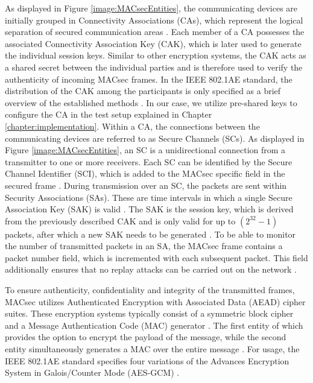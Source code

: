 \documentclass[conference, onecolumn, a4paper]{IEEEtran}
\begin{document}
\noindent As displayed in Figure \ref{image:MACsecEntities}, the communicating devices are initially grouped in Connectivity Associations (CAs), which 
represent the logical separation of secured communication areas \cite[p. 35]{IEEE-802-1AE:2018}. Each member of a CA possesses the associated Connectivity 
Association Key (CAK), which is later used to generate the individual session keys. Similar to other encryption systems, the CAK acts as a shared 
secret between the individual parties and is therefore used to verify the authenticity of incoming MACsec frames. In the IEEE 802.1AE standard, the 
distribution of the CAK among the participants is only specified as a brief overview of the established methods \cite[p. 230]{IEEE-802-1AE:2018}. 
In our case, we utilize pre-shared keys to configure the CA in the test setup explained in Chapter \ref{chapter:implementation}. Within a CA, the 
connections between the communicating devices are referred to as Secure Channels (SCs). As displayed in Figure \ref{image:MACsecEntities}, 
an SC is a unidirectional connection from a transmitter to one or more receivers. Each SC can be identified by the Secure Channel Identifier (SCI), 
which is added to the MACsec specific field in the secured frame \cite[p. 43]{IEEE-802-1AE:2018}. During transmission over an SC, the packets are sent 
within Security Associations (SAs). These are time intervals in which a single Secure Association Key (SAK) is valid \cite[p. 44]{IEEE-802-1AE:2018}. 
The SAK is the session key, which is derived from the previously described CAK and is only valid for up to ${(2^{32} -1)}$ packets, after which a new 
SAK needs to be generated \cite[p. 66]{IEEE-802-1AE:2018}. To be able to monitor the number of transmitted packets in an SA, the MACsec frame contains 
a packet number field, which is incremented with each subsequent packet. This field additionally ensures that no replay attacks can be carried out on 
the network \cite[p. 145]{IEEE-802-1AE:2018}. 

\smallskip
To ensure authenticity, confidentiality and integrity of the transmitted frames, MACsec utilizes Authenticated Encryption with Associated Data (AEAD) 
cipher suites. These encryption systems typically consist of a symmetric block cipher and a Message Authentication Code (MAC) generator 
\cite{NIST-AES_GCM:2007}. The first entity of which provides the option to encrypt the payload of the message, while the second entity simultaneously 
generates a MAC over the entire message \cite{GOOSE_confidentiality_integrity:2020}. For usage, the IEEE 802.1AE standard specifies four variations of 
the Advances Encryption System in Galois/Counter Mode (AES-GCM) \cite[p. 143ff]{IEEE-802-1AE:2018}.
\end{document}
